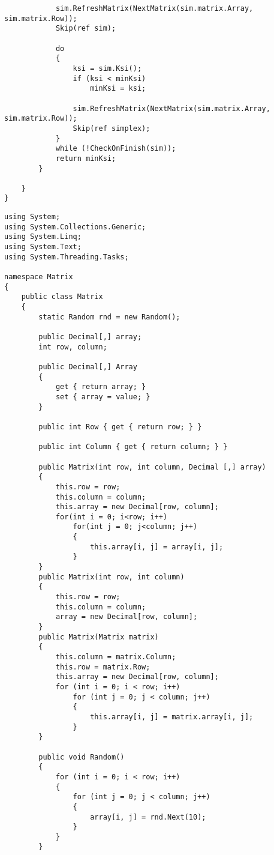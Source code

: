 \documentclass[12pt]{article} %
\begin{document}
\begin{verbatim}
            sim.RefreshMatrix(NextMatrix(sim.matrix.Array, sim.matrix.Row));
            Skip(ref sim);

            do
            {
                ksi = sim.Ksi();
                if (ksi < minKsi)
                    minKsi = ksi;

                sim.RefreshMatrix(NextMatrix(sim.matrix.Array, sim.matrix.Row));
                Skip(ref simplex);
            }
            while (!CheckOnFinish(sim));
            return minKsi;
        }

    }
}

\end{verbatim}

\begin{verbatim}
using System;
using System.Collections.Generic;
using System.Linq;
using System.Text;
using System.Threading.Tasks;

namespace Matrix
{
    public class Matrix
    {
        static Random rnd = new Random();

        public Decimal[,] array;
        int row, column;

        public Decimal[,] Array
        {
            get { return array; }
            set { array = value; }
        }

        public int Row { get { return row; } }

        public int Column { get { return column; } }

        public Matrix(int row, int column, Decimal [,] array)
        {
            this.row = row;
            this.column = column;
            this.array = new Decimal[row, column];
            for(int i = 0; i<row; i++)
                for(int j = 0; j<column; j++)
                {
                    this.array[i, j] = array[i, j];
                }
        }
        public Matrix(int row, int column)
        {
            this.row = row;
            this.column = column;
            array = new Decimal[row, column];
        }
        public Matrix(Matrix matrix)
        {
            this.column = matrix.Column;
            this.row = matrix.Row;
            this.array = new Decimal[row, column];
            for (int i = 0; i < row; i++)
                for (int j = 0; j < column; j++)
                {
                    this.array[i, j] = matrix.array[i, j];
                }
        }

        public void Random()
        {
            for (int i = 0; i < row; i++)
            {
                for (int j = 0; j < column; j++)
                {
                    array[i, j] = rnd.Next(10);
                }
            }
        }


\end{verbatim}
\end{document}
